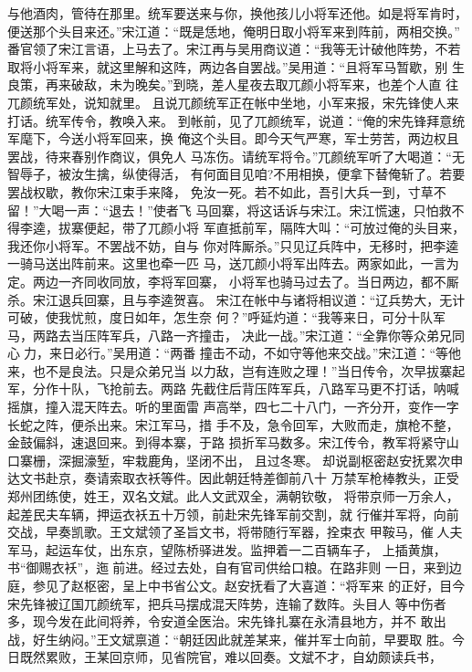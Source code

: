 与他酒肉，管待在那里。统军要送来与你，换他孩儿小将军还他。如是将军肯时，
便送那个头目来还。”宋江道：“既是恁地，俺明日取小将军来到阵前，两相交换。”
番官领了宋江言语，上马去了。宋江再与吴用商议道：“我等无计破他阵势，不若
取将小将军来，就这里解和这阵，两边各自罢战。”吴用道：“且将军马暂歇，别
生良策，再来破敌，未为晚矣。”到晓，差人星夜去取兀颜小将军来，也差个人直
往兀颜统军处，说知就里。
且说兀颜统军正在帐中坐地，小军来报，宋先锋使人来打话。统军传令，教唤入来。
到帐前，见了兀颜统军，说道：“俺的宋先锋拜意统军麾下，今送小将军回来，换
俺这个头目。即今天气严寒，军士劳苦，两边权且罢战，待来春别作商议，俱免人
马冻伤。请统军将令。”兀颜统军听了大喝道：“无智辱子，被汝生擒，纵使得活，
有何面目见咱?不用相换，便拿下替俺斩了。若要罢战权歇，教你宋江束手来降，
免汝一死。若不如此，吾引大兵一到，寸草不留！”大喝一声：“退去！”使者飞
马回寨，将这话诉与宋江。宋江慌速，只怕救不得李逵，拔寨便起，带了兀颜小将
军直抵前军，隔阵大叫：“可放过俺的头目来，我还你小将军。不罢战不妨，自与
你对阵厮杀。”只见辽兵阵中，无移时，把李逵一骑马送出阵前来。这里也牵一匹
马，送兀颜小将军出阵去。两家如此，一言为定。两边一齐同收同放，李将军回寨，
小将军也骑马过去了。当日两边，都不厮杀。宋江退兵回寨，且与李逵贺喜。
宋江在帐中与诸将相议道：“辽兵势大，无计可破，使我忧煎，度日如年，怎生奈
何？”呼延灼道：“我等来日，可分十队军马，两路去当压阵军兵，八路一齐撞击，
决此一战。”宋江道：“全靠你等众弟兄同心力，来日必行。”吴用道：“两番
撞击不动，不如守等他来交战。”宋江道：“等他来，也不是良法。只是众弟兄当
以力敌，岂有连败之理！”当日传令，次早拔寨起军，分作十队，飞抢前去。两路
先截住后背压阵军兵，八路军马更不打话，呐喊摇旗，撞入混天阵去。听的里面雷
声高举，四七二十八门，一齐分开，变作一字长蛇之阵，便杀出来。宋江军马，措
手不及，急令回军，大败而走，旗枪不整，金鼓偏斜，速退回来。到得本寨，于路
损折军马数多。宋江传令，教军将紧守山口寨栅，深掘濠堑，牢栽鹿角，坚闭不出，
且过冬寒。
却说副枢密赵安抚累次申达文书赴京，奏请索取衣袄等件。因此朝廷特差御前八十
万禁军枪棒教头，正受郑州团练使，姓王，双名文斌。此人文武双全，满朝钦敬，
将带京师一万余人，起差民夫车辆，押运衣袄五十万领，前赴宋先锋军前交割，就
行催并军将，向前交战，早奏凯歌。王文斌领了圣旨文书，将带随行军器，拴束衣
甲鞍马，催人夫军马，起运车仗，出东京，望陈桥驿进发。监押着一二百辆车子，
上插黄旗，书“御赐衣袄”，迤前进。经过去处，自有官司供给口粮。在路非则
一日，来到边庭，参见了赵枢密，呈上中书省公文。赵安抚看了大喜道：“将军来
的正好，目今宋先锋被辽国兀颜统军，把兵马摆成混天阵势，连输了数阵。头目人
等中伤者多，现今发在此间将养，令安道全医治。宋先锋扎寨在永清县地方，并不
敢出战，好生纳闷。”王文斌禀道：“朝廷因此就差某来，催并军士向前，早要取
胜。今日既然累败，王某回京师，见省院官，难以回奏。文斌不才，自幼颇读兵书，
